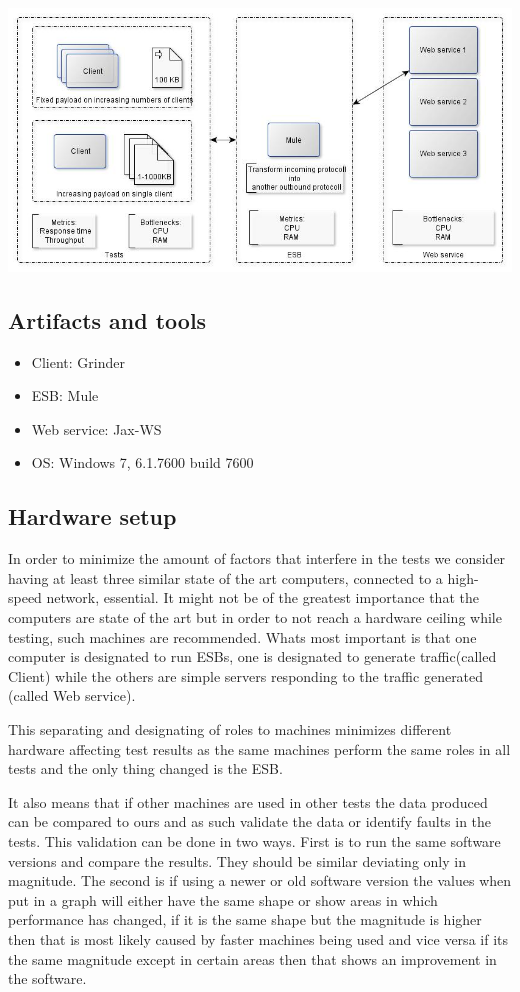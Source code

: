 \includegraphics[scale=0.5]{img/transformation}
\subsection{Artifacts and tools}
\begin{itemize}
	\item Client: Grinder \cite{grinder kod}
	\item ESB: Mule \cite{Mule kod}
	\item Web service: Jax-WS \cite{Jax-ws kod}
	\item OS: Windows 7, 6.1.7600 build 7600
\end{itemize}

\subsection{Hardware setup}
 In order to minimize the amount of factors that interfere in the tests we consider having at least three similar state of the art computers, connected to a high-speed network, essential.
It might not be of the greatest importance that the computers are state of the art but in order to not reach a hardware ceiling while testing, such machines are recommended. Whats most important is that one computer is designated to run ESBs, one is designated to generate traffic(called Client) while the others are simple servers responding to the traffic generated (called Web service). 

This separating and designating of roles to machines minimizes different hardware affecting test results as the same machines perform the same roles in all tests and the only thing changed is the ESB. 

It also means that if other machines are used in other tests the data produced can be compared to ours and as such validate the data or identify faults in the tests. This validation can be done in two ways. First is to run the same software versions and compare the results. They should be similar deviating only in magnitude. The second is if using a newer or old software version the values when put in a graph will either have the same shape or show areas in which performance has changed, if it is the same shape but the magnitude is higher then that is most likely caused by faster machines being used and vice versa if its the same magnitude except in certain areas then that shows an improvement in the software.

